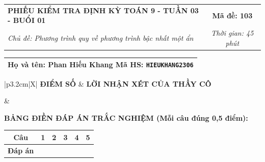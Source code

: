 \documentclass[12pt,a4paper]{article}
\begin{document}
\newpage


\noindent
\begin{tabularx}{\linewidth}{|X|c|}
\hline
\textbf{PHIẾU KIỂM TRA ĐỊNH KỲ TOÁN 9 - TUẦN 03 - BUỔI 01} & \textbf{Mã đề: 103} \\
\textit{Chủ đề: Phương trình quy về phương trình bậc nhất một ẩn} & \textit{Thời gian: 45 phút} \\
\hline
\end{tabularx}

\vspace{1mm}

\noindent
\begin{tabularx}{\linewidth}{|X|}
\hline
\rule[-2mm]{0pt}{7.5mm}\textbf{Họ và tên:} \textbf{\large Phan Hiếu Khang} \hfill \textbf{Mã HS:} \texttt{HIEUKHANG2306} \quad \\
\hline
\end{tabularx}

\vspace{1mm}

\noindent
\begin{tabularx}{\linewidth}{|p{3.2cm}|X|}
\hline
\centering\textbf{ĐIỂM SỐ} & \centering\textbf{LỜI NHẬN XÉT CỦA THẦY CÔ} \tabularnewline
\hline
\rule{0pt}{1.3cm} & \tabularnewline
\hline
\end{tabularx}

\vspace{1.2mm}

\noindent\textbf{BẢNG ĐIỀN ĐÁP ÁN TRẮC NGHIỆM (Mỗi câu đúng 0,5 điểm):}
\vspace{0.8mm}

\noindent
\renewcommand{\arraystretch}{1.35}
\begin{tabularx}{\linewidth}{|c|*{5}{>{\centering\arraybackslash}X|}}
\hline
\textbf{Câu} & \textbf{1} & \textbf{2} & \textbf{3} & \textbf{4} & \textbf{5} \\
\hline
\textbf{Đáp án} & & & & & \\
\hline
\end{tabularx}
\renewcommand{\arraystretch}{1.0}

\vspace{1.5mm}
\end{document}
